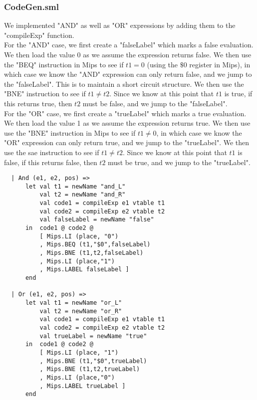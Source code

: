 \documentclass[12pt]{article}
\begin{document}
\subsubsection{CodeGen.sml}
We implemented "AND" as well as "OR" expressions by adding them to the "compileExp" function.\\

For the "AND" case, we first create a "falseLabel" which marks a false evaluation. We then load the value 0 as we assume the expression returns false. We then use the "BEQ" instruction in Mips to see if \(t1 = 0\) (using the \(\$0\) register in Mips), in which case we know the "AND" expression can only return false, and we jump to the "falseLabel". This is to maintain a short circuit structure. We then use the "BNE" instruction to see if \(t1\neq t2\). Since we know at this point that \(t1\) is true, if this returns true, then \(t2\) must be false, and we jump to the "falseLabel". \\

For the "OR" case, we first create a "trueLabel" which marks a true evaluation. We then load the value 1 as we assume the expression returns true. We then use use the "BNE" instruction in Mips to see if \(t1 \neq 0\), in which case we know the "OR" expression can only return true, and we jump to the "trueLabel". We then use the sae instruction to see if \(t1\neq t2\). Since we know at this point that \(t1\) is false, if this returns false, then \(t2\) must be true, and we jump to the "trueLabel". 
\begin{verbatim}
  | And (e1, e2, pos) =>
      let val t1 = newName "and_L"
          val t2 = newName "and_R"
          val code1 = compileExp e1 vtable t1
          val code2 = compileExp e2 vtable t2
          val falseLabel = newName "false"
      in  code1 @ code2 @
          [ Mips.LI (place, "0")
          , Mips.BEQ (t1,"$0",falseLabel)
          , Mips.BNE (t1,t2,falseLabel)
          , Mips.LI (place,"1") 
          , Mips.LABEL falseLabel ]
      end
      
  | Or (e1, e2, pos) =>
      let val t1 = newName "or_L"
          val t2 = newName "or_R"
          val code1 = compileExp e1 vtable t1
          val code2 = compileExp e2 vtable t2
          val trueLabel = newName "true"
      in  code1 @ code2 @
          [ Mips.LI (place, "1")
          , Mips.BNE (t1,"$0",trueLabel)
          , Mips.BNE (t1,t2,trueLabel)
          , Mips.LI (place,"0")
          , Mips.LABEL trueLabel ]
      end

\end{verbatim}
\end{document}
